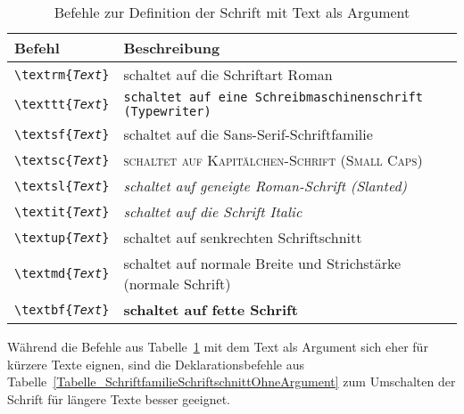 \begin{table}[h!tb]
\centering
\caption{Befehle zur Definition der Schrift mit Text als Argument}
\label{Tabelle_SchriftfamilieSchriftschnittMitArgument}       %
\begin{tabular}{ll}
\hline
Befehl & Beschreibung \\
\hline
\texttt{\textbackslash textrm\{\textsl{Text}\}} & \textrm{schaltet auf die Schriftart Roman} \\
\texttt{\textbackslash texttt\{\textsl{Text}\}} & \texttt{schaltet auf eine Schreibmaschinenschrift (Typewriter)} \\
\texttt{\textbackslash textsf\{\textsl{Text}\}} & \textsf{schaltet auf die Sans-Serif-Schriftfamilie} \\
\texttt{\textbackslash textsc\{\textsl{Text}\}} & \textsc{schaltet auf Kapitälchen-Schrift (Small Caps)} \\
\texttt{\textbackslash textsl\{\textsl{Text}\}} & \textsl{schaltet auf geneigte Roman-Schrift (Slanted)} \\
\texttt{\textbackslash textit\{\textsl{Text}\}} & \textit{schaltet auf die Schrift Italic} \\
\texttt{\textbackslash textup\{\textsl{Text}\}} & \textup{schaltet auf senkrechten Schriftschnitt} \\
\texttt{\textbackslash textmd\{\textsl{Text}\}} & \textmd{schaltet auf normale Breite und Strichstärke (normale Schrift)} \\
\texttt{\textbackslash textbf\{\textsl{Text}\}} & \textbf{schaltet auf fette Schrift} \\
\hline
\end{tabular}
\end{table}

Während die Befehle aus Tabelle~\ref{Tabelle_SchriftfamilieSchriftschnittMitArgument} mit dem Text als Argument sich eher für kürzere Texte eignen, sind die Deklarationsbefehle aus Tabelle~\ref{Tabelle_SchriftfamilieSchriftschnittOhneArgument} zum Umschalten der Schrift für längere Texte besser geeignet.

